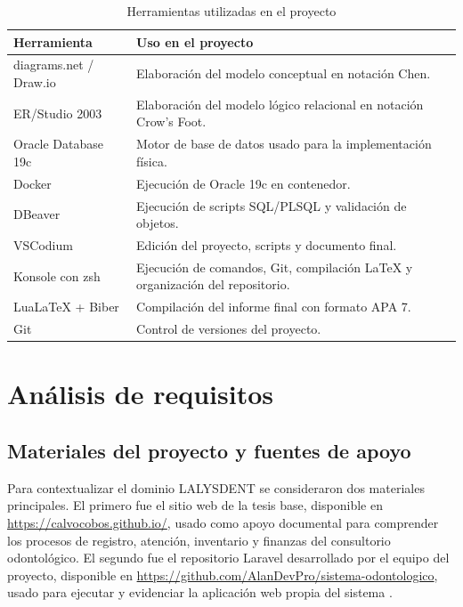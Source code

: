 \begin{table}[H]
\caption{Herramientas utilizadas en el proyecto}
\centering
\small
\begin{tabularx}{\textwidth}{L{0.28\textwidth}Y}
\toprule
\textbf{Herramienta} & \textbf{Uso en el proyecto} \\
\midrule
diagrams.net / Draw.io & Elaboración del modelo conceptual en notación Chen. \\
ER/Studio 2003 & Elaboración del modelo lógico relacional en notación Crow's Foot. \\
Oracle Database 19c & Motor de base de datos usado para la implementación física. \\
Docker & Ejecución de Oracle 19c en contenedor. \\
DBeaver & Ejecución de scripts SQL/PLSQL y validación de objetos. \\
VSCodium & Edición del proyecto, scripts y documento final. \\
Konsole con zsh & Ejecución de comandos, Git, compilación LaTeX y organización del repositorio. \\
LuaLaTeX + Biber & Compilación del informe final con formato APA 7. \\
Git & Control de versiones del proyecto. \\
\bottomrule
\end{tabularx}
\end{table}

\section{Análisis de requisitos}

\subsection{Materiales del proyecto y fuentes de apoyo}

Para contextualizar el dominio LALYSDENT se consideraron dos materiales principales. El primero fue el sitio web de la tesis base, disponible en \url{https://calvocobos.github.io/}, usado como apoyo documental para comprender los procesos de registro, atención, inventario y finanzas del consultorio odontológico. El segundo fue el repositorio Laravel desarrollado por el equipo del proyecto, disponible en \url{https://github.com/AlanDevPro/sistema-odontologico}, usado para ejecutar y evidenciar la aplicación web propia del sistema \parencite{calvocobos2025web,sistemaodontologicogithub}.

